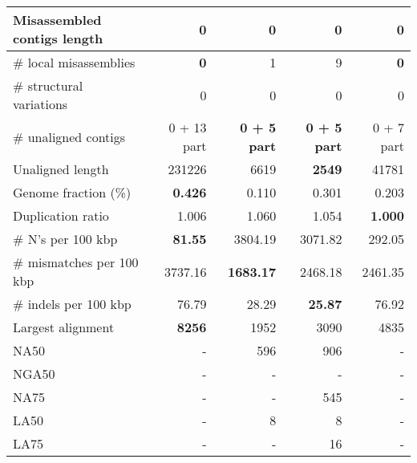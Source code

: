 \documentclass[12pt,a4paper]{article}
\begin{document}
\begin{table}[ht]
\begin{center}
\begin{tabular}{|l*{4}{|r}|}
Misassembled contigs length & 0 & 0 & 0 & 0 \\ \hline
\# local misassemblies & {\bf 0} & 1 & 9 & {\bf 0} \\ \hline
\# structural variations & 0 & 0 & 0 & 0 \\ \hline
\# unaligned contigs & 0 + 13 part & {\bf 0 + 5 part} & {\bf 0 + 5 part} & 0 + 7 part \\ \hline
Unaligned length & 231226 & 6619 & {\bf 2549} & 41781 \\ \hline
Genome fraction (\%) & {\bf 0.426} & 0.110 & 0.301 & 0.203 \\ \hline
Duplication ratio & 1.006 & 1.060 & 1.054 & {\bf 1.000} \\ \hline
\# N's per 100 kbp & {\bf 81.55} & 3804.19 & 3071.82 & 292.05 \\ \hline
\# mismatches per 100 kbp & 3737.16 & {\bf 1683.17} & 2468.18 & 2461.35 \\ \hline
\# indels per 100 kbp & 76.79 & 28.29 & {\bf 25.87} & 76.92 \\ \hline
Largest alignment & {\bf 8256} & 1952 & 3090 & 4835 \\ \hline
NA50 & - & 596 & 906 & - \\ \hline
NGA50 & - & - & - & - \\ \hline
NA75 & - & - & 545 & - \\ \hline
LA50 & - & 8 & 8 & - \\ \hline
LA75 & - & - & 16 & - \\ \hline
\end{tabular}
\end{center}
\end{table}
\end{document}

